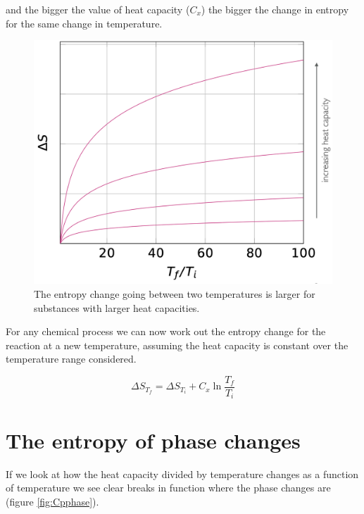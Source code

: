 \documentclass[
]{book}
\begin{document}
and the bigger the value of heat capacity (\(C_x\)) the bigger the change in entropy for the same change in temperature.

\begin{figure}

{\centering \includegraphics[width=0.8\linewidth]{images/entropyheatcapacity} 

}

\caption{The entropy change going between two temperatures is larger for substances with larger heat capacities.}\label{fig:entropyheatcapacity}
\end{figure}

For any chemical process we can now work out the entropy change for the reaction at a new temperature, assuming the heat capacity is constant over the temperature range considered.

\begin{equation}
\Delta S_{T_f} = \Delta S_{T_i} + C_x \ln \frac{T_f}{T_i}
\label{eq:entropyrxntemp}
\end{equation}

\hypertarget{the-entropy-of-phase-changes}{%
\section{The entropy of phase changes}\label{the-entropy-of-phase-changes}}

If we look at how the heat capacity divided by temperature changes as a function of temperature we see clear breaks in function where the phase changes are (figure \ref{fig:Cpphase}).
\end{document}
